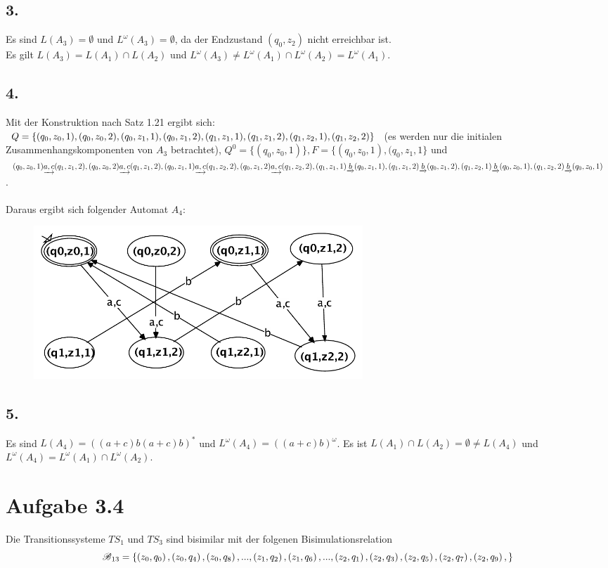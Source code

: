 \documentclass[12pt, paper=a4]{article}
\begin{document}
\subsection*{3.}	
	Es sind \(L(A_3)=\emptyset\) und \(L^\omega(A_3)=\emptyset\),
	da der Endzustand \((q_0,z_2)\) nicht erreichbar ist.\\
	Es gilt \(L(A_3)=L(A_1)\cap L(A_2)\) und 
	\(L^\omega(A_3)\neq L^\omega(A_1)\cap L^\omega(A_2)=L^\omega(A_1)\).
	
\subsection*{4.}	
	Mit der Konstruktion nach Satz 1.21 ergibt sich:\\
	\(Q=\{(q_0,z_0,1),(q_0,z_0,2),(q_0,z_1,1),(q_0,z_1,2),(q_1,z_1,1),(q_1,z_1,2),(q_1,z_2,1),\\(q_1,z_2,2)\}\) 
	(es werden nur die initialen Zusammenhangskomponenten von \(A_3\) betrachtet),
	\(Q^0=\{(q_0,z_0,1)\}, F=\{(q_0,z_0,1),(q_0,z_1,1\} \) und \\
	\((q_0,z_0,1)\underrightarrow{a,c}(q_1,z_1,2),(q_0,z_0,2)\underrightarrow{a,c}(q_1,z_1,2),
	(q_0,z_1,1)\underrightarrow{a,c}(q_1,z_2,2),\\(q_0,z_1,2)\underrightarrow{a,c}(q_1,z_2,2),
	(q_1,z_1,1)\underrightarrow{b}(q_0,z_1,1), (q_1,z_1,2)\underrightarrow{b}(q_0,z_1,2),\\
	(q_1,z_2,1)\underrightarrow{b}(q_0,z_0,1),(q_1,z_2,2)\underrightarrow{b}(q_0,z_0,1)\).\\
	\\
	Daraus ergibt sich folgender Automat \(A_4\): \\
	\begin {figure}[h]
  		\centering \includegraphics[width=0.6\textwidth]{A4}
	\end {figure}
	
\subsection*{5.}
	Es sind \(L(A_4)=((a+c)b(a+c)b)^*\) und \(L^\omega(A_4)=((a+c)b)^\omega\).
	Es ist \(L(A_1)\cap L(A_2)=\emptyset \neq L(A_4)\) und
	\(L^\omega(A_4) = L^\omega(A_1)\cap L^\omega(A_2)\).

\section*{Aufgabe 3.4}
	Die Transitionssysteme $TS_{1}$ und $TS_{3}$ sind bisimilar mit
	der folgenen Bisimulationsrelation 
	\[
		\text{\ensuremath{\mathscr{B}}}_{13}=\left\{ \left(z_{0},q_{0}\right),\left(z_{0},q_{4}\right),\left(z_{0},q_{8}		\right),...,\left(z_{1},q_{2}\right),\left(z_{1},q_{6}\right),...,\left(z_{2},q_{1}\right),\left(z_{2},q_{3}			\right),\left(z_{2},q_{5}\right),\left(z_{2},q_{7}\right),\left(z_{2},q_{9}\right),\right\} 
	\]
\end{document}
